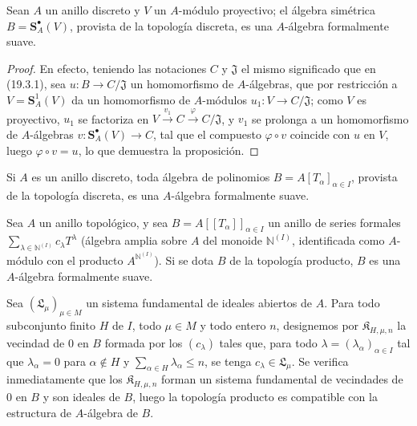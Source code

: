 \begin{proposition}[19.3.2]
\label{0.19.3.2-fr}
Sean $A$ un anillo discreto y $V$ un $A$-módulo proyectivo; el álgebra
simétrica $B=\mathbf S_A^\bullet(V)$, provista de la topología discreta, es una
$A$-álgebra formalmente suave.
\end{proposition}

\begin{proof}
En efecto, teniendo las notaciones $C$ y $\mathfrak J$ el mismo significado que en
(19.3.1), sea $u:B\to C/\mathfrak J$ un homomorfismo de $A$-álgebras, que
por restricción a $V=\mathbf S_A^1(V)$ da un homomorfismo de $A$-módulos
$u_1:V\to C/\mathfrak J$; como $V$ es proyectivo, $u_1$ se factoriza en
$V\xrightarrow{v_1}C\xrightarrow{\varphi}C/\mathfrak J$, y $v_1$ se
prolonga a un homomorfismo de $A$-álgebras
$v:\mathbf S_A^\bullet(V)\to C$, tal que el compuesto
$\varphi\circ v$ coincide con $u$ en $V$, luego
$\varphi\circ v=u$, lo que demuestra la proposición.
\end{proof}

\begin{corollary}[19.3.3]
\label{0.19.3.3-fr}
Si $A$ es un anillo discreto, toda álgebra de polinomios
$B=A[T_\alpha]_{\alpha\in I}$, provista de la topología discreta, es una
$A$-álgebra formalmente suave.
\end{corollary}

\begin{proposition}[19.3.4]
\label{0.19.3.4-fr}
Sea $A$ un anillo topológico, y sea
$B=A[[T_\alpha]]_{\alpha\in I}$ un anillo de series formales
$\sum_{\lambda\in\mathbb{N}^{(I)}}c_\lambda T^\lambda$ (álgebra amplia sobre
$A$ del monoide $\mathbb{N}^{(I)}$, identificada como $A$-módulo con el producto
$A^{\mathbb{N}^{(I)}}$). Si se dota $B$ de la topología producto, $B$ es una
$A$-álgebra formalmente suave.
\end{proposition}

Sea $(\mathfrak L_\mu)_{\mu\in M}$ un sistema fundamental de ideales abiertos
de $A$. Para todo subconjunto finito $H$ de $I$, todo $\mu\in M$ y todo entero
$n$, designemos por $\mathfrak K_{H,\mu,n}$ la vecindad de $0$ en $B$ formada
por los $(c_\lambda)$ tales que, para todo
$\lambda=(\lambda_\alpha)_{\alpha\in I}$ tal que
$\lambda_\alpha=0$ para $\alpha\notin H$ y
$\sum_{\alpha\in H}\lambda_\alpha\leq n$, se tenga
$c_\lambda\in\mathfrak L_\mu$. Se verifica inmediatamente que los
$\mathfrak K_{H,\mu,n}$ forman un sistema fundamental de vecindades de $0$
en $B$ y son ideales de $B$, luego la topología producto es compatible
con la estructura de $A$-álgebra de $B$.

